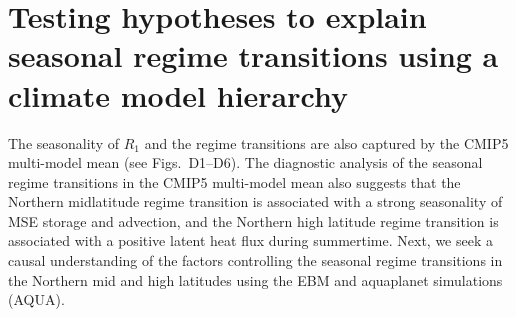 \documentclass{ametsocV5}
\begin{document}



\section{Testing hypotheses to explain seasonal regime transitions using a climate model hierarchy} \label{sec:hypo}

  
  The seasonality of $R_1$ and the regime transitions are also captured by the CMIP5 multi-model mean (see Figs.~D1--D6). The diagnostic analysis of the seasonal regime transitions in the CMIP5 multi-model mean also suggests that the Northern midlatitude regime transition is associated with a strong seasonality of MSE storage and advection, and the Northern high latitude regime transition is associated with a positive latent heat flux during summertime. Next, we seek a causal understanding of the factors controlling the seasonal regime transitions in the Northern mid and high latitudes using the EBM and aquaplanet simulations (AQUA).
  
  
\end{document}
